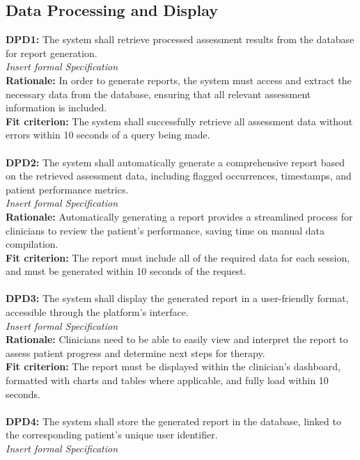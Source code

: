 \documentclass[12pt]{article}
\begin{document}
\subsection{Data Processing and Display}
\textbf{DPD1: }The system shall retrieve processed assessment results from the database for report generation.\\
\textit{Insert formal Specification}\\
\textbf{Rationale: }In order to generate reports, the system must access and extract the necessary data from the database, ensuring that all relevant assessment information is included.\\
\textbf{Fit criterion: }The system shall successfully retrieve all assessment data without errors within 10 seconds of a query being made.\\
\\
\noindent\textbf{DPD2: }The system shall automatically generate a comprehensive report based on the retrieved assessment data, including flagged occurrences, timestamps, and patient performance metrics.\\
\textit{Insert formal Specification}\\
\textbf{Rationale: }Automatically generating a report provides a streamlined process for clinicians to review the patient’s performance, saving time on manual data compilation.\\
\textbf{Fit criterion: }The report must include all of the required data for each session, and must be generated within 10 seconds of the request.\\
\\
\noindent\textbf{DPD3: }The system shall display the generated report in a user-friendly format, accessible through the platform’s interface.\\
\textit{Insert formal Specification}\\
\textbf{Rationale: }Clinicians need to be able to easily view and interpret the report to assess patient progress and determine next steps for therapy.\\
\textbf{Fit criterion: }The report must be displayed within the clinician's dashboard, formatted with charts and tables where applicable, and fully load within 10 seconds.\\
\\
\noindent\textbf{DPD4: }The system shall store the generated report in the database, linked to the corresponding patient’s unique user identifier.\\
\textit{Insert formal Specification}\\
\end{document}
